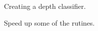 
\begin{DoxyRefList}
\item[\label{todo__todo000001}%
\hypertarget{todo__todo000001}{}%
page \hyperlink{index}{Project\-: Social Robot Using N\-A\-O and Kinect} ]Creating a depth classifier. 

Speed up some of the rutines.
\end{DoxyRefList}